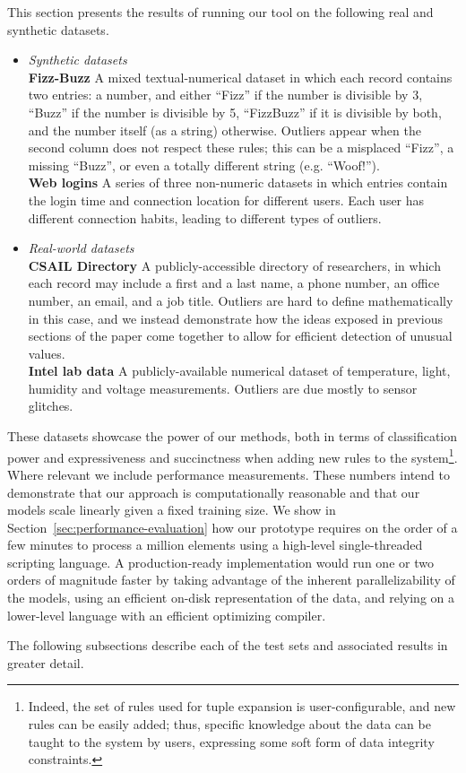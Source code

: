 This section presents the results of running our tool on the following real and synthetic datasets.

\begin{itemize}
\item \emph{Synthetic datasets}\\
  \textbf{Fizz-Buzz} A mixed textual-numerical dataset in which each record contains two entries: a number, and either ``Fizz'' if the number is divisible by 3, ``Buzz'' if the number is divisible by 5, ``FizzBuzz'' if it is divisible by both, and the number itself (as a string) otherwise. Outliers appear when the second column does not respect these rules; this can be a misplaced ``Fizz'', a missing ``Buzz'', or even a totally different string (e.g. ``Woof!'').\\
  \textbf{Web logins} A series of three non-numeric datasets in which entries contain the login time and connection location for different users. Each user has different connection habits, leading to different types of outliers.
\item \emph{Real-world datasets}\\
  \textbf{CSAIL Directory} A publicly-accessible directory of researchers, in which each record may include a first and a last name, a phone number, an office number, an email, and a job title. Outliers are hard to define mathematically in this case, and we instead demonstrate how the ideas exposed in previous sections of the paper come together to allow for efficient detection of unusual values.\\
  \textbf{Intel lab data} A publicly-available numerical dataset of temperature, light, humidity and voltage measurements. Outliers are due mostly to sensor glitches.
\end{itemize}

These datasets showcase the power of our methods, both in terms of classification power and expressiveness and succinctness when adding new rules to the system\footnote{Indeed, the set of rules used for tuple expansion is user-configurable, and new rules can be easily added; thus, specific knowledge about the data can be taught to the system by users, expressing some soft form of data integrity constraints.}. Where relevant we include performance measurements. These numbers intend to demonstrate that our approach is computationally reasonable and that our models scale linearly given a fixed training size. We show in Section~\ref{sec:performance-evaluation} how our prototype requires on the order of a few minutes to process a million elements using a high-level single-threaded scripting language. A production-ready implementation would run one or two orders of magnitude faster by taking advantage of the inherent parallelizability of the models, using an efficient on-disk representation of the data, and relying on a lower-level language with an efficient optimizing compiler.

The following subsections describe each of the test sets and associated results in greater detail.






%
%
